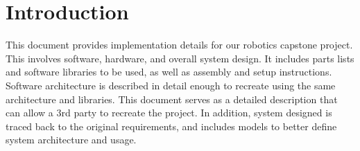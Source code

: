 
\section{Introduction}
\label{sec:introduction}
This document provides implementation details for our robotics capstone project. This involves software, hardware, and overall system design. It includes parts lists and software libraries to be used, as well as assembly and setup instructions. Software architecture is described in detail enough to recreate using the same architecture and libraries. This document serves as a detailed description that can allow a 3rd party to recreate the project. In addition, system designed is traced back to the original requirements, and includes models to better define system architecture and usage.
